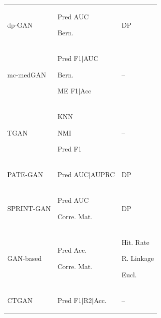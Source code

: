 \begin{landscape}
\begin{table}[htbp]
\begin{tabular}{p{26mm} p{84mm} p{60mm}}
dp-GAN &	\begin{enumerate*} \item Pred AUC \item Bern. \end{enumerate*} &	DP	 \\

mc-medGAN & 	\begin{enumerate*} \item Pred F1$\vert$AUC \item Bern. \item ME F1$\vert$Acc\end{enumerate*} & -- 	\\

TGAN &	\begin{enumerate*} \item KNN \item NMI \item Pred F1 \end{enumerate*} & --\\

PATE-GAN & \begin{enumerate*} \item  Pred AUC$\vert$AUPRC \end{enumerate*}	& DP \\
SPRINT-GAN & \begin{enumerate*}	\item Pred AUC \item Corre. Mat. \end{enumerate*} &	DP \\

GAN-based &	  \begin{enumerate*} \item Pred Acc. \item Corre. Mat. \end{enumerate*} & \begin{enumerate*} \item Hit. Rate \item R. Linkage  \item Eucl. \end{enumerate*} \\

CTGAN &	\begin{enumerate*} \item Pred F1$\vert$R2$\vert$Acc. \end{enumerate*} &  --\\


\end{tabular}
\end{table}
\end{landscape}
